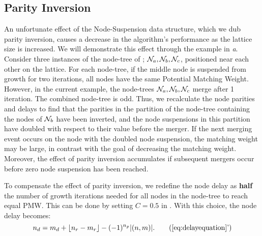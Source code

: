 \subsection{Parity Inversion}\label{sec:inversion}
An unfortunate effect of the Node-Suspension data structure, which we dub parity inversion, causes a decrease in the algorithm's performance as the lattice size is increased. We will demonstrate this effect through the example in \emph{a}. Consider three instances of the node-tree of ; $\mathcal{N}_a, \mathcal{N}_b, \mathcal{N}_c$, positioned near each other on the lattice. For each node-tree, if the middle node is suspended from growth for two iterations, all nodes have the same Potential Matching Weight. However, in the current example, the node-trees $\mathcal{N}_a, \mathcal{N}_b, \mathcal{N}_c$ merge after 1 iteration. The combined node-tree is odd. Thus, we recalculate the node parities and delays to find that the parities in the partition of the node-tree containing the nodes of $\mathcal{N}_b$ have been inverted, and the node suspensions in this partition have doubled with respect to their value before the merger. If the next merging event occurs on the node with the doubled node suspension, the matching weight may be large, in contrast with the goal of decreasing the matching weight. Moreover, the effect of parity inversion accumulates if subsequent mergers occur before zero node suspension has been reached. %

To compensate the effect of parity inversion, we redefine the node delay as \textbf{half} the number of growth iterations needed for all nodes in the node-tree to reach equal PMW. This can be done by setting $C=0.5$ in . With this choice, the node delay becomes: 
\begin{equation*}
    n_d = m_d + \floor{n_r-m_r}- (-1)^{n_p}\abs{(n,m)}. \tag{\ref{eq:delayequation}'}
\end{equation*}
